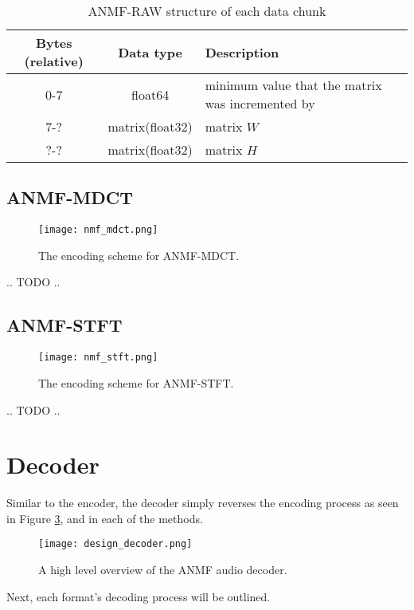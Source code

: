 \begin{table}[htbp]\caption{ANMF-RAW structure of each data chunk}
	\label{tab:anmf_raw_data}
	\centering
	\begin{tabular}{|c|c|l|}
		\hline
		Bytes (relative) & Data type & Description \\ \hline
		0-7 & float64 & minimum value that the matrix was incremented by \\
		7-? & matrix(float32) & matrix $W$ \\
		?-? & matrix(float32) & matrix $H$ \\
		\hline
	\end{tabular}
\end{table}

\subsection{ANMF-MDCT}
\begin{figure}[ht]
	\caption[ANMF-MDCT Encoder]{The encoding scheme for ANMF-MDCT.}
	\label{fig:encoding_nmf_mdct}
	\centering
	\texttt{[image: nmf\_mdct.png]}
\end{figure}

.. TODO ..

\subsection{ANMF-STFT}
\begin{figure}[ht]
	\caption[ANMF-STFT Encoder]{The encoding scheme for ANMF-STFT.}		\label{fig:encoding_nmf_stft}
	\centering
	\texttt{[image: nmf\_stft.png]}
\end{figure}

.. TODO ..

\section{Decoder}
Similar to the encoder, the decoder simply reverses the encoding process as seen in Figure \ref{fig:design_decoder}, and in each of the methods.

\begin{figure}[ht]
	\caption[Decoder overview]{A high level overview of the ANMF audio decoder.}
	\label{fig:design_decoder}
	\centering
	\texttt{[image: design\_decoder.png]}
\end{figure}

Next, each format's decoding process will be outlined.

